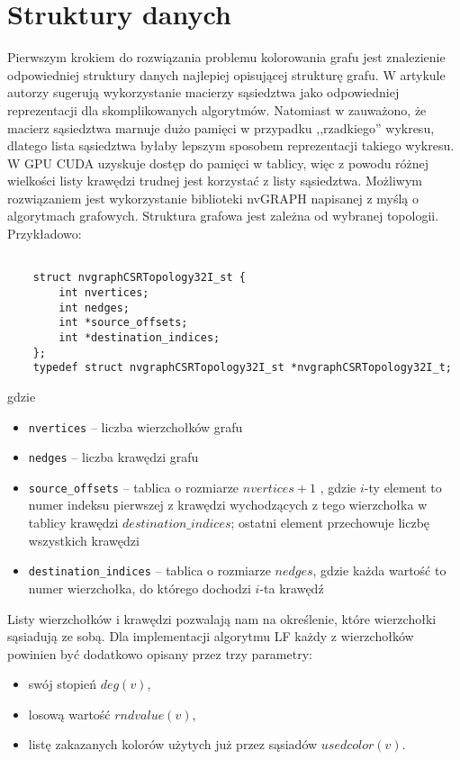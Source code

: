 \documentclass{article}
\begin{document}
  


 
	\section{Struktury danych}
	Pierwszym krokiem do rozwiązania problemu kolorowania grafu jest znalezienie odpowiedniej struktury danych najlepiej opisującej strukturę grafu. W artykule \cite{Shen2017} autorzy sugerują wykorzystanie macierzy sąsiedztwa jako odpowiedniej reprezentacji dla skomplikowanych algorytmów. Natomiast w \cite{SINGH20155} zauważono, że macierz sąsiedztwa marnuje dużo pamięci w przypadku ,,rzadkiego'' wykresu, dlatego lista sąsiedztwa byłaby lepszym sposobem reprezentacji takiego wykresu. W GPU CUDA uzyskuje dostęp do pamięci w tablicy, więc z powodu różnej wielkości listy krawędzi trudnej jest korzystać z listy sąsiedztwa. Możliwym rozwiązaniem jest wykorzystanie biblioteki nvGRAPH napisanej z myślą o algorytmach grafowych. Struktura grafowa jest zależna od wybranej topologii. Przykładowo:
	\begin{lstlisting}
	
	struct nvgraphCSRTopology32I_st {
		int nvertices;
		int nedges;
		int *source_offsets;
		int *destination_indices;
	};
	typedef struct nvgraphCSRTopology32I_st *nvgraphCSRTopology32I_t;
	\end{lstlisting}
	gdzie
	\begin{itemize}
		\itemsep0em
		\item \texttt{nvertices} -- liczba wierzchołków grafu
		\item \texttt{nedges} -- liczba krawędzi grafu
		\item \texttt{source\_offsets} -- tablica o rozmiarze $nvertices+1$ , gdzie $i$-ty element to numer indeksu pierwszej z krawędzi wychodzących z tego wierzchołka w tablicy krawędzi $destination\_indices$; ostatni element przechowuje liczbę wszystkich krawędzi
		\item \texttt{destination\_indices} -- tablica o rozmiarze $nedges$, gdzie każda wartość to numer wierzchołka, do którego dochodzi $i$-ta krawędź
	\end{itemize}
	Listy wierzchołków i krawędzi pozwalają nam na określenie, które wierzchołki sąsiadują ze sobą. Dla implementacji algorytmu LF każdy z wierzchołków powinien być dodatkowo opisany przez trzy parametry:
	\begin{itemize}
		\itemsep0em
		\item swój stopień $deg(v)$,
		\item losową wartość $rndvalue(v)$, 
		\item listę zakazanych kolorów użytych już przez sąsiadów $usedcolor(v)$. 
	\end{itemize}
\end{document}
